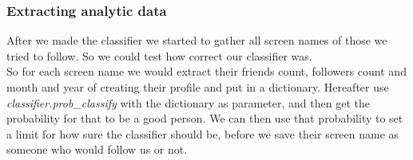 \subsubsection{Extracting analytic data}
After we made the classifier we started to gather all screen names of those we tried to follow. So we could test how correct our classifier was.\\
So for each screen name we would extract their friends count, followers count and month and year of creating their profile and put in a dictionary. Hereafter use \textit{classifier.prob\_classify} with the dictionary as parameter, and then get the probability for that to be a good person.
We can then use that probability to set a limit for how sure the classifier should be, before we save their screen name as someone who would follow us or not. 